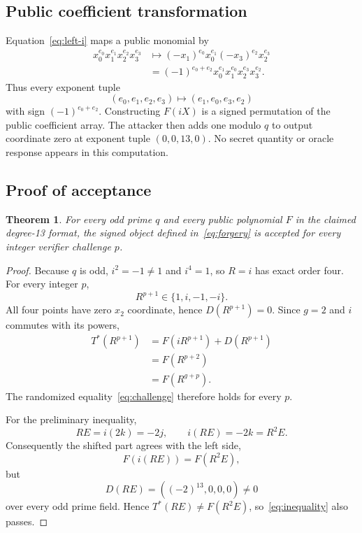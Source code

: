 \documentclass[10pt,a4paper]{article}
\newtheorem{theorem}{Theorem}
\begin{document}
\subsection{Public coefficient transformation}

Equation~\eqref{eq:left-i} maps a public monomial by
\begin{align*}
 x_0^{e_0}x_1^{e_1}x_2^{e_2}x_3^{e_3}
 &\longmapsto
 (-x_1)^{e_0}x_0^{e_1}(-x_3)^{e_2}x_2^{e_3}\\
 &=(-1)^{e_0+e_2}
 x_0^{e_1}x_1^{e_0}x_2^{e_3}x_3^{e_2}.
\end{align*}
Thus every exponent tuple
\[
 (e_0,e_1,e_2,e_3)
 \longmapsto (e_1,e_0,e_3,e_2)
\]
with sign $(-1)^{e_0+e_2}$.  Constructing $F(iX)$ is a signed permutation of
the public coefficient array.  The attacker then adds one modulo $q$ to output
coordinate zero at exponent tuple $(0,0,13,0)$.  No secret quantity or oracle
response appears in this computation.

\subsection{Proof of acceptance}

\begin{theorem}
For every odd prime $q$ and every public polynomial $F$ in the claimed
degree-13 format, the signed object defined in~\eqref{eq:forgery} is accepted
for every integer verifier challenge $p$.
\end{theorem}

\begin{proof}
Because $q$ is odd, $i^2=-1\ne1$ and $i^4=1$, so $R=i$ has exact order four.
For every integer $p$,
\[
 R^{p+1}\in\{1,i,-1,-i\}.
\]
All four points have zero $x_2$ coordinate, hence
$D(R^{p+1})=0$.  Since $g=2$ and $i$ commutes with its powers,
\begin{align*}
 T^*(R^{p+1})
 &=F(iR^{p+1})+D(R^{p+1})\\
 &=F(R^{p+2})\\
 &=F(R^{g+p}).
\end{align*}
The randomized equality~\eqref{eq:challenge} therefore holds for every $p$.

For the preliminary inequality,
\[
 RE=i(2k)=-2j,
 \qquad i(RE)=-2k=R^2E.
\]
Consequently the shifted part agrees with the left side,
\[
 F(i(RE))=F(R^2E),
\]
but
\[
 D(RE)=((-2)^{13},0,0,0)\ne0
\]
over every odd prime field.  Hence
$T^*(RE)\ne F(R^2E)$, so~\eqref{eq:inequality} also passes.
\end{proof}
\end{document}
